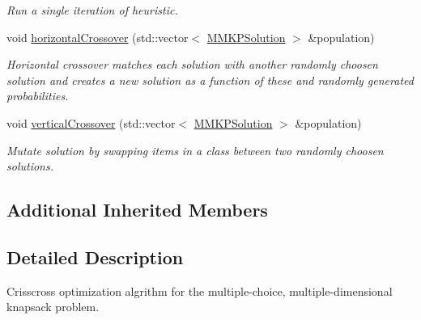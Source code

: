 \begin{DoxyCompactItemize}
\begin{DoxyCompactList}\small\item\em Run a single iteration of heuristic. \end{DoxyCompactList}\item 
\hypertarget{class_m_m_k_p___c_o_a_ac844d27466908cc418b84821fd26a8cd}{void \hyperlink{class_m_m_k_p___c_o_a_ac844d27466908cc418b84821fd26a8cd}{horizontal\+Crossover} (std\+::vector$<$ \hyperlink{class_m_m_k_p_solution}{M\+M\+K\+P\+Solution} $>$ \&population)}\label{class_m_m_k_p___c_o_a_ac844d27466908cc418b84821fd26a8cd}

\begin{DoxyCompactList}\small\item\em Horizontal crossover matches each solution with another randomly choosen solution and creates a new solution as a function of these and randomly generated probabilities. \end{DoxyCompactList}\item 
\hypertarget{class_m_m_k_p___c_o_a_a030d4eb88e3df0523bf0d7673d7162ff}{void \hyperlink{class_m_m_k_p___c_o_a_a030d4eb88e3df0523bf0d7673d7162ff}{vertical\+Crossover} (std\+::vector$<$ \hyperlink{class_m_m_k_p_solution}{M\+M\+K\+P\+Solution} $>$ \&population)}\label{class_m_m_k_p___c_o_a_a030d4eb88e3df0523bf0d7673d7162ff}

\begin{DoxyCompactList}\small\item\em Mutate solution by swapping items in a class between two randomly choosen solutions. \end{DoxyCompactList}\end{DoxyCompactItemize}
\subsection*{Additional Inherited Members}


\subsection{Detailed Description}
Crisscross optimization algrithm for the multiple-\/choice, multiple-\/dimensional knapsack problem. 

